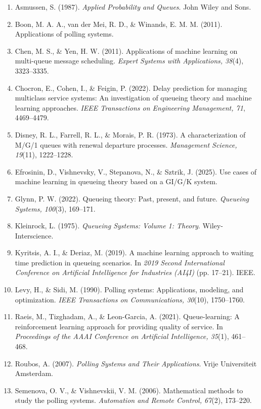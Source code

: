 \documentclass[12pt]{article}
\begin{document}
\begin{enumerate}
  \item Asmussen, S. (1987). \textit{Applied Probability and Queues}. John Wiley and Sons.
  \item Boon, M. A. A., van der Mei, R. D., \& Winands, E. M. M. (2011). Applications of polling systems.
  \item Chen, M. S., \& Yen, H. W. (2011). Applications of machine learning on multi-queue message scheduling. \textit{Expert Systems with Applications, 38}(4), 3323–3335.
  \item Chocron, E., Cohen, I., \& Feigin, P. (2022). Delay prediction for managing multiclass service systems: An investigation of queueing theory and machine learning approaches. \textit{IEEE Transactions on Engineering Management, 71}, 4469–4479.
  \item Disney, R. L., Farrell, R. L., \& Morais, P. R. (1973). A characterization of M/G/1 queues with renewal departure processes. \textit{Management Science, 19}(11), 1222–1228.
  \item Efrosinin, D., Vishnevsky, V., Stepanova, N., \& Sztrik, J. (2025). Use cases of machine learning in queueing theory based on a GI/G/K system.
  \item Glynn, P. W. (2022). Queueing theory: Past, present, and future. \textit{Queueing Systems, 100}(3), 169–171.
  \item Kleinrock, L. (1975). \textit{Queueing Systems: Volume 1: Theory}. Wiley-Interscience.
  \item Kyritsis, A. I., \& Deriaz, M. (2019). A machine learning approach to waiting time prediction in queueing scenarios. In \textit{2019 Second International Conference on Artificial Intelligence for Industries (AI4I)} (pp. 17–21). IEEE.
  \item Levy, H., \& Sidi, M. (1990). Polling systems: Applications, modeling, and optimization. \textit{IEEE Transactions on Communications, 30}(10), 1750–1760.
  \item Raeis, M., Tizghadam, A., \& Leon-Garcia, A. (2021). Queue-learning: A reinforcement learning approach for providing quality of service. In \textit{Proceedings of the AAAI Conference on Artificial Intelligence, 35}(1), 461–468.
  \item Roubos, A. (2007). \textit{Polling Systems and Their Applications}. Vrije Universiteit Amsterdam.
  \item Semenova, O. V., \& Vishnevskii, V. M. (2006). Mathematical methods to study the polling systems. \textit{Automation and Remote Control, 67}(2), 173–220.

\end{enumerate}
\end{document}
